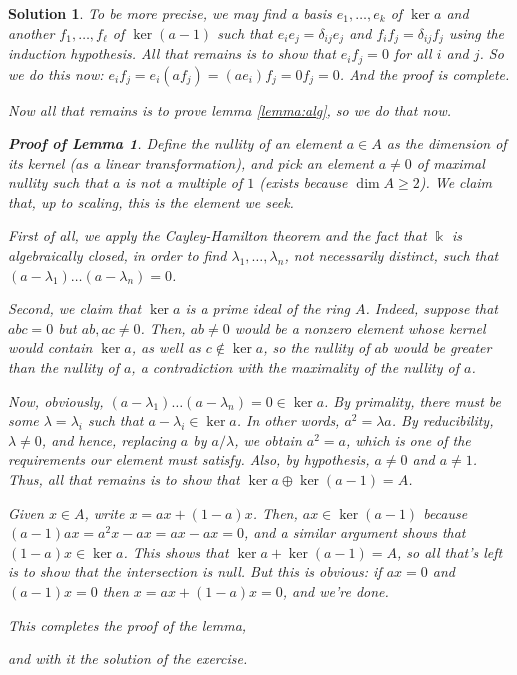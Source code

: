 \documentclass{article}
\theoremstyle{nonumberplain}
\newtheorem{sol}{Solution}
\newtheorem{lemmaproof}{Proof of Lemma}
\newcommand{\kk}{\Bbbk}
\begin{document}
\begin{sol}
To be more precise, we may find a basis $e_1, \dots, e_k$ of $\ker a$ and another $f_1, \dots, f_\ell$ of $\ker(a-1)$ such that $e_i e_j = \delta_{ij} e_j$ and $f_i f_j = \delta_{ij} f_j$ using the induction hypothesis. All that remains is to show that $e_i f_j = 0$ for all $i$ and $j$. So we do this now: $e_i f_j = e_i (a f_j) = (a e_i) f_j = 0 f_j = 0$. And the proof is complete.

Now all that remains is to prove lemma \ref{lemma:alg}, so we do that now.

\begin{lemmaproof}
Define the nullity of an element $a \in A$ as the dimension of its kernel (as a linear transformation), and pick an element $a \neq 0$ of maximal nullity such that $a$ is not a multiple of $1$ (exists because $\dim A \geq 2$). We claim that, up to scaling, this is the element we seek.

First of all, we apply the Cayley-Hamilton theorem and the fact that $\kk$ is algebraically closed, in order to find $\lambda_1, \dots, \lambda_n$, not necessarily distinct, such that $(a-\lambda_1) \dots  (a - \lambda_n) = 0$.

Second, we claim that $\ker a$ is a prime ideal of the ring $A$. Indeed, suppose that $abc = 0$ but $ab, ac \neq 0$. Then, $ab \neq 0$ would be a nonzero element whose kernel would contain $\ker a$, as well as $c \not \in \ker a$, so the nullity of $ab$ would be greater than the nullity of $a$, a contradiction with the maximality of the nullity of $a$.

Now, obviously, $(a-\lambda_1) \dots (a-\lambda_n) = 0 \in \ker a$. By primality, there must be some $\lambda = \lambda_i$ such that $a-\lambda_i \in \ker a$. In other words, $a^2 = \lambda a$. By reducibility, $\lambda \neq 0$, and hence, replacing $a$ by $a/\lambda$, we obtain $a^2 = a$, which is one of the requirements our element must satisfy. Also, by hypothesis, $a \neq 0$ and $a \neq 1$. Thus, all that remains is to show that $\ker a \oplus \ker(a-1) = A$.

Given $x \in A$, write $x = ax + (1-a)x$. Then, $ax \in \ker(a-1)$ because $(a-1)ax = a^2 x - ax = ax - ax = 0$, and a similar argument shows that $(1-a)x \in \ker a$. This shows that $\ker a + \ker(a-1) = A$, so all that's left is to show that the intersection is null. But this is obvious: if $ax = 0$ and $(a-1)x = 0$ then $x = ax + (1-a)x = 0$, and we're done.

This completes the proof of the lemma,
\end{lemmaproof}
and with it the solution of the exercise.
\end{sol}
\end{document}
